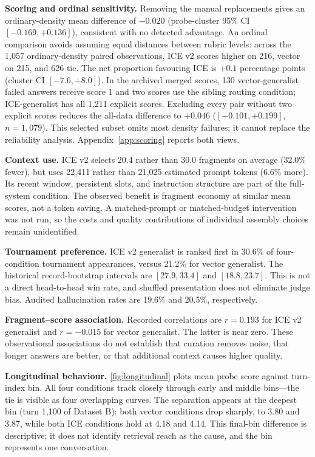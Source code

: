 \documentclass[twoside,11pt]{article}
\begin{document}
\textbf{Scoring and ordinal sensitivity.} Removing the manual replacements gives an ordinary-density mean difference of $-0.020$ (probe-cluster 95\% CI $[-0.169,+0.136]$), consistent with no detected advantage. An ordinal comparison avoids assuming equal distances between rubric levels: across the 1,057 ordinary-density paired observations, ICE v2 scores higher on 216, vector on 215, and 626 tie. The net proportion favouring ICE is $+0.1$ percentage points (cluster CI $[-7.6,+8.0]$). In the archived merged scores, 130 vector-generalist failed answers receive score 1 and two scores use the sibling routing condition; ICE-generalist has all 1,211 explicit scores. Excluding every pair without two explicit scores reduces the all-data difference to $+0.046$ ($[-0.101,+0.199]$, $n=1,079$). This selected subset omits most density failures; it cannot replace the reliability analysis. Appendix~\ref{app:scoring} reports both views.


\textbf{Context use.} ICE v2 selects 20.4 rather than 30.0 fragments on average (32.0\% fewer), but uses 22,411 rather than 21,025 estimated prompt tokens (6.6\% more). Its recent window, persistent slots, and instruction structure are part of the full-system condition. The observed benefit is fragment economy at similar mean scores, not a token saving. A matched-prompt or matched-budget intervention was not run, so the costs and quality contributions of individual assembly choices remain unidentified.

\textbf{Tournament preference.} ICE v2 generalist is ranked first in 30.6\% of four-condition tournament appearances, versus 21.2\% for vector generalist. The historical record-bootstrap intervals are $[27.9,33.4]$ and $[18.8,23.7]$. This is not a direct head-to-head win rate, and shuffled presentation does not eliminate judge bias. Audited hallucination rates are 19.6\% and 20.5\%, respectively.

\textbf{Fragment--score association.} Recorded correlations are $r=0.193$ for ICE v2 generalist and $r=-0.015$ for vector generalist. The latter is near zero. These observational associations do not establish that curation removes noise, that longer answers are better, or that additional context causes higher quality.

\textbf{Longitudinal behaviour.} \cref{fig:longitudinal} plots mean probe score against turn-index bin. All four conditions track closely through early and middle bins---the tie is visible as four overlapping curves. The separation appears at the deepest bin (turn 1{,}100 of Dataset B): both vector conditions drop sharply, to 3.80 and 3.87, while both ICE conditions hold at 4.18 and 4.14. This final-bin difference is descriptive; it does not identify retrieval reach as the cause, and the bin represents one conversation.
\end{document}
